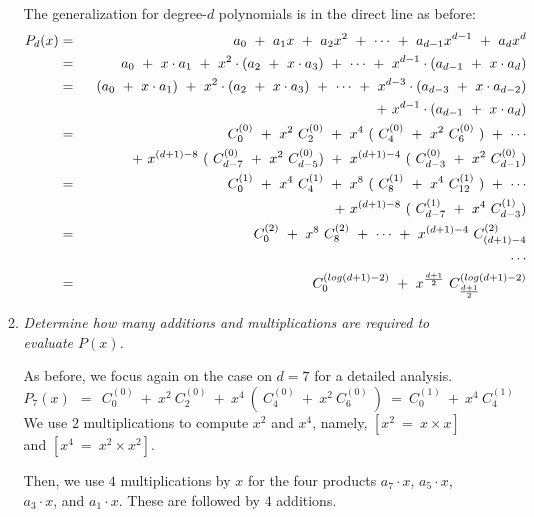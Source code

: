 \begin{itemize}
\begin{enumerate}
The generalization for degree-$d$ polynomials is in the direct line as before:
\begin{eqnarray*}
P_d(x) & = & \ \ a_0 \ + \ a_1 x \ + \ a_2 x^2 \ +  \ \cdots \ + \ a_{d-1} x^{d-1} \ + \ a_{d} x^{d} \\
& = & \ \ a_0 \ + \ x \cdot a_1 \ + \ x^2 \cdot (a_2  \ + \ x \cdot a_3) \  +  \ \cdots \ + \ x^{d-1} \cdot (a_{d-1}  \ + \ x \cdot a_{d})\\
& = & \ \ (a_0 \ + \ x \cdot a_1) \ + \ x^2 \cdot (a_2  \ + \ x \cdot a_3) \ + \ \cdots \ + \ x^{d-3} \cdot (a_{d-3} \ + \ x \cdot a_{d-2}) \\
& & \ \ + \ x^{d-1} \cdot (a_{d-1}  \ + \ x \cdot a_{d}) \\
& = & \ C_{0}^{(0)} \ + \ x^2 \ C_2^{(0)} \ + \ x^4 \ ( \ C_4^{(0)} \ + \ x^2 \ C_{6}^{(0)} \ )  \ + \ \cdots \\
&  & \ + \ x^{(d+1)-8} \ (\ C_{d-7}^{(0)} \ + \ x^2 \ C_{d-5}^{(0)}) \ + \ x^{(d+1)-4} \ ( \ C_{d-3}^{(0)} \ + \ x^2 \ C_{d-1}^{(0)} ) \\
& = & \ C_{0}^{(1)} \ + \ x^4 \ C_4^{(1)} \ + \ x^8 \ ( \ C_8^{(1)} \ + \ x^4 \ C_{12}^{(1)} \ )  \ + \ \cdots \\
&  &  \ + \ x^{(d+1)-8} \ ( \ C_{d-7}^{(1)} \ + \ x^4 \ C_{d-3}^{(1)} ) \\
& = & \ C_{0}^{(2)} \ + \ x^8 \ C_8^{(2)}  \ + \ \cdots \ + \ x^{(d+1)-4} \ C_{(d+1)-4}^{(2)} \\
& & \cdots \\
& = & \ C_0^{(log (d+1)-2)} \ + \ x^{{d+1} \over {2}} \ C_{{d+1} \over {2}}^{(log (d+1)-2)} 
\end{eqnarray*}

\medskip
\item
{\em Determine how many additions and multiplications are required to evaluate $P(x)$.}

As before, we focus again on the case on $d=7$ for a detailed analysis. 
\[
P_7(x) \ \ = \ \ C_{0}^{(0)} \ + \ x^2 \ C_2^{(0)} \ + 
\ x^4 \ ( \ C_4^{(0)} \ + \ x^2 \ C_6^{(0)} \ )
\ = \ C_0^{(1)} \ + \ x^4 \ C_4^{(1)} 
\]
We use $2$ multiplications to compute $x^2$ and $x^4$, namely,
$[x^2 \ = \ x \times x]$ and $[x^4 \ = \ x^2 \times x^2]$.

\smallskip

Then, we use $4$ multiplications by $x$ for the four products $a_7 \cdot x$,  $a_5 \cdot x$, $a_3 \cdot x$, and $a_1 \cdot x$.  These are followed by $4$ additions.

\smallskip


\end{enumerate}
\end{itemize}
